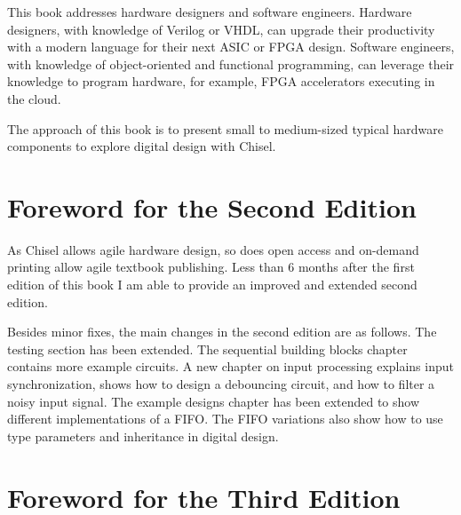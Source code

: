 \documentclass[%
    10pt,
    headinclude, footexclude,
    openright, %
    notitlepage,
    cleardoubleempty,
    headsepline,
    pointlessnumbers,
    bibtotoc, idxtotoc,
    ]{scrbook}
\begin{document}
This book addresses hardware designers and software engineers. Hardware designers, with knowledge of Verilog or VHDL, can upgrade their productivity with a modern language for their next ASIC or FPGA design. Software engineers, with knowledge of object-oriented and functional programming, can leverage their knowledge to program hardware, for example, FPGA accelerators executing in the cloud.

The approach of this book is to present small to medium-sized typical hardware components to explore digital design with Chisel.




\section*{Foreword for the Second Edition}

As Chisel allows agile hardware design, so does open access and on-demand printing
allow agile textbook publishing. Less than 6 months after the first edition of this book
I am able to provide an improved and extended second edition.

Besides minor fixes, the main changes in the second edition are as follows.
The testing section has been extended. The sequential building blocks chapter contains
more example circuits. A new chapter on input processing explains input synchronization,
shows how to design a debouncing circuit, and how to filter a noisy input signal.
The example designs chapter has been extended to show different implementations of a FIFO.
The FIFO variations also show how to use type parameters and inheritance in digital design. 

\section*{Foreword for the Third Edition}
\end{document}
